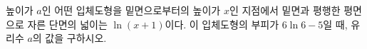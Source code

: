 \hspace*{2mm}\begin{minipage}[t]{\dimexpr\linewidth-2mm\relax}\vspace{0pt}
높이가 $a$인 어떤 입체도형을 밑면으로부터의 높이가 $x$인 지점에서 밑면과 평행한 평면으로 자른 단면의 넓이는 $\ln(x+1)$이다. 이 입체도형의 부피가 $6\ln 6-5$일 때, 유리수 $a$의 값을 구하시오.\end{minipage}
